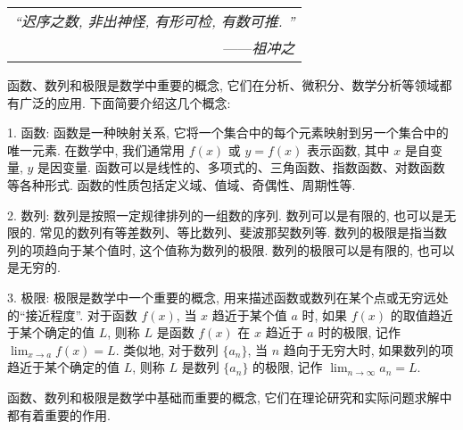 \begin{flushright}
    \begin{tabular}{r|}
        \textit{“迟序之数, 非出神怪, 有形可检, 有数可推. ”}\\
        ——\textit{祖冲之}
    \end{tabular}
\end{flushright}

函数、数列和极限是数学中重要的概念, 它们在分析、微积分、数学分析等领域都有广泛的应用. 下面简要介绍这几个概念: 

1. 函数: 函数是一种映射关系, 它将一个集合中的每个元素映射到另一个集合中的唯一元素. 在数学中, 我们通常用 $f(x)$ 或 $y = f(x)$ 表示函数, 其中 $x$ 是自变量, $y$ 是因变量. 函数可以是线性的、多项式的、三角函数、指数函数、对数函数等各种形式. 函数的性质包括定义域、值域、奇偶性、周期性等. 

2. 数列: 数列是按照一定规律排列的一组数的序列. 数列可以是有限的, 也可以是无限的. 常见的数列有等差数列、等比数列、斐波那契数列等. 数列的极限是指当数列的项趋向于某个值时, 这个值称为数列的极限. 数列的极限可以是有限的, 也可以是无穷的. 

3. 极限: 极限是数学中一个重要的概念, 用来描述函数或数列在某个点或无穷远处的“接近程度”. 对于函数 $f(x)$, 当 $x$ 趋近于某个值 $a$ 时, 如果 $f(x)$ 的取值趋近于某个确定的值 $L$, 则称 $L$ 是函数 $f(x)$ 在 $x$ 趋近于 $a$ 时的极限, 记作 $\displaystyle\lim_{x \to a} f(x) = L$. 类似地, 对于数列 $\{a_n\}$, 当 $n$ 趋向于无穷大时, 如果数列的项趋近于某个确定的值 $L$, 则称 $L$ 是数列 $\{a_n\}$ 的极限, 记作 $\displaystyle\lim_{n \to \infty} a_n = L$. 

函数、数列和极限是数学中基础而重要的概念, 它们在理论研究和实际问题求解中都有着重要的作用.  
